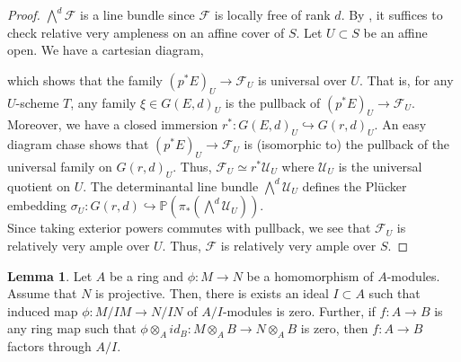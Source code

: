 \documentclass[11pt]{amsart}
\newcommand{\sF}{{\mathcal F}}
\newcommand{\sU}{{\mathcal U}}
\renewcommand{\P}{{\mathbb P}}
\theoremstyle{definition}
\newtheorem{lemma}[theorem]{Lemma}
\begin{document}
\begin{proof}
	$\bigwedge^d \sF$ is a line bundle since $\sF$ is locally free of rank $d$. By \cite[Tag 01VR]{stacks-project}, it suffices to check relative very ampleness on an affine cover of $S$. Let $U\subset S$ be an affine open. We have a cartesian diagram,
	\begin{center}
	\end{center}
	which shows that the family $(p^*E)_U\rightarrow \sF_U$ is universal over $U$. That is, for any $U$-scheme $T$, any family $\xi\in G(E,d)_U$ is the pullback of $(p^*E)_U\rightarrow \sF_U$. Moreover, we have a closed immersion $r^*:G(E,d)_U\hookrightarrow G(r,d)_U$. An easy diagram chase shows that $(p^*E)_U\rightarrow \sF_U$ is (isomorphic to) the pullback of the universal family on $G(r,d)_U$. Thus, $\sF_U \simeq r^*\sU_U$ where $\sU_U$ is the universal quotient on $U$. The determinantal line bundle $\bigwedge^d \sU_U$ defines the Pl\"{u}cker embedding $\sigma_U:G(r,d)\hookrightarrow \P(\pi_*(\bigwedge^d \sU_U))$.\\
	Since taking exterior powers commutes with pullback, we see that $\sF_U$ is relatively very ample over $U$. Thus, $\sF$ is relatively very ample over $S$.
\end{proof}

\begin{lemma}
	\label{lemma-vanishing-locus-module-homomorphism}
	Let $A$ be a ring and $\phi: M\rightarrow N$ be a homomorphism of $A$-modules. Assume that $N$ is projective. Then, there is exists an ideal $I\subset A$ such that induced map $\phi:M/IM\rightarrow N/IN$  of $A/I$-modules is zero. Further, if $f:A\rightarrow B$ is any ring map such that $\phi \otimes_A id_B:M\otimes_A B\rightarrow N\otimes_A B$ is zero, then $f:A\rightarrow B$ factors through $A/I$.
\end{lemma}
\end{document}
